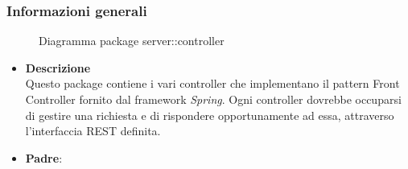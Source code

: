\subsubsection{Informazioni generali}
\begin{figure}[H]
	\caption{Diagramma package server::controller}
\end{figure}
\begin{itemize}
\item \textbf{Descrizione}\\
Questo package contiene i vari controller che implementano il pattern Front Controller fornito dal framework \emph{Spring}. Ogni controller dovrebbe occuparsi di gestire una richiesta e di rispondere opportunamente ad essa, attraverso l'interfaccia REST definita.
\item \textbf{Padre}: \hyperref[\nogloxy{swedesigner::server}]{}
\end{itemize}
